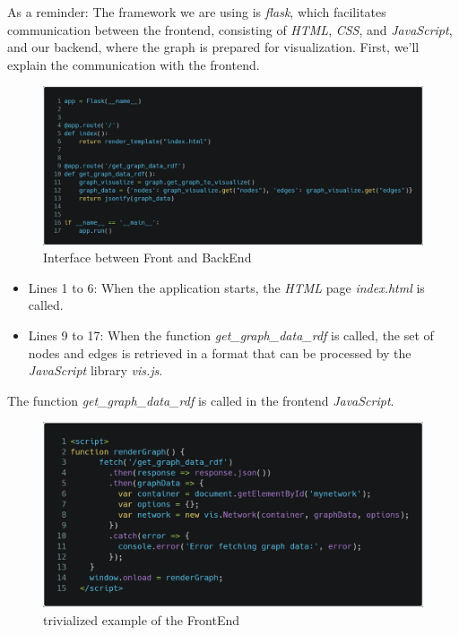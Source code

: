 As a reminder: The framework we are using is \textit{flask}, which facilitates communication between the frontend, consisting of \textit{HTML}, \textit{CSS}, and \textit{JavaScript}, 
and our backend, where the graph is prepared for visualization. First, we'll explain the communication with the frontend.

\begin{figure}[H]
    \includegraphics[scale=0.2]{Graphics/simple_ontology_flask.png}
    \caption{Interface between Front and BackEnd}
    \end{figure}
    
\begin{itemize}
    \item Lines 1 to 6: When the application starts, the \textit{HTML} page \textit{index.html} is called.
    \item Lines 9 to 17: When the function \textit{get\_graph\_data\_rdf} is called, the set of nodes and edges is retrieved in a format that can be processed by the \textit{JavaScript} library \textit{vis.js}.
\end{itemize}

The function \textit{get\_graph\_data\_rdf} is called in the frontend \textit{JavaScript}.

\begin{figure}[H]
    \includegraphics[scale=0.23]{Graphics/simple_ontology_js.png}
    \caption{trivialized example of the FrontEnd}
    \end{figure}

